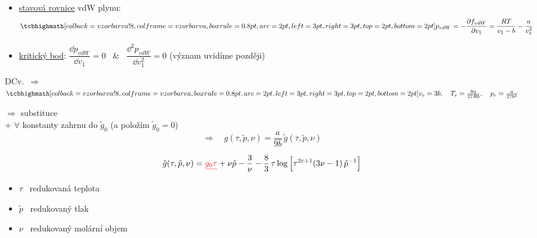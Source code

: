 \begin{itemize}
  \item \underline{stavová rovnice} vdW plynu:
  \[ \vzorec{p_{vdW} = -\pdv{f_{vdW}}{v_1} = \frac{RT}{v_1 - b} - \frac{a}{v_1^2}} \]
  \item \underline{kritický bod}: \quad $\dfrac{\dd p_{vdW}}{\dd v_1} = 0$ \ \& \ $\dfrac{\dd^2 p_{vdW}}{\dd v_1^2} = 0$ \quad (význam uvidíme později)
\end{itemize}
DCv.\ $\Rightarrow$ \quad $\vzorec{v_c = 3b,\quad T_c = \frac{8a}{27Rb},\quad p_c = \frac{a}{27b^2}}$

$\Rightarrow$ substituce \quad {} \\
+ $\forall$ konstanty zahrnu do $\tilde g_0$ (a položím $\tilde g_0 = 0$)
\[ \Rightarrow\quad g(\tau,\tilde p,\nu) = \frac{a}{9b}\,\tilde g(\tau,\tilde p,\nu) \]

\[
  \tilde g(\tau,\tilde p,\nu) = {\color{Red}\sout{g_0\tau}} + \nu\tilde p - \frac{3}{\nu} - \frac83\,\tau\log\Big[\tau^{2c+1}(3\nu - 1)\,\tilde p^{-1}\Big]
\]
\begin{itemize}[nosep]
  \item $\tau$ \ redukovaná teplota
  \item $\tilde p$ \ redukovaný tlak
  \item $\nu$ \ redukovaný molární objem 
\end{itemize}

